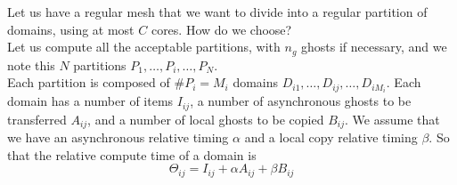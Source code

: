\documentclass[aps,onecolumn,11pt]{revtex4}
\begin{document}
Let us have a regular mesh that we want to divide into a regular partition of domains, using at most $C$ cores.
How do we choose?\\
Let us compute all the acceptable partitions, with $n_g$ ghosts if necessary, and we note this $N$ partitions 
$P_1,\ldots,P_i,\ldots,P_N$.\\
Each partition is composed of $\#P_i=M_i$ domains $D_{i1},\ldots,D_{ij},\ldots,D_{iM_i}$.
Each domain has a number of items $I_{ij}$, a number of asynchronous ghosts to be transferred $A_{ij}$, 
and a number of local ghosts to be copied $B_{ij}$. We assume that we have an asynchronous relative
timing $\alpha$ and a local copy relative timing $\beta$.
So that the relative compute time of a domain is
$$
	\Theta_{ij} = I_{ij} + \alpha A_{ij} + \beta B_{ij}
$$
\end{document}
